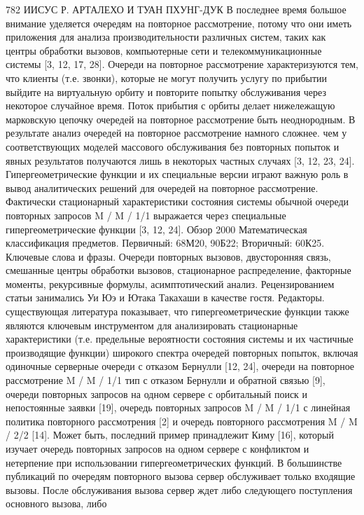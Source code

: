 782 ИИСУС Р. АРТАЛЕХО И ТУАН ПХУНГ-ДУК
В последнее время большое внимание уделяется очередям на повторное рассмотрение, потому что они
иметь приложения для анализа производительности различных систем, таких как центры обработки вызовов,
компьютерные сети и телекоммуникационные системы [3, 12, 17, 28]. Очереди на повторное рассмотрение
характеризуются тем, что клиенты (т.е. звонки), которые не могут получить услугу
по прибытии выйдите на виртуальную орбиту и повторите попытку обслуживания через некоторое случайное время.
Поток прибытия с орбиты делает нижележащую марковскую цепочку очередей на повторное рассмотрение
быть неоднородным. В результате анализ очередей на повторное рассмотрение намного сложнее.
чем у соответствующих моделей массового обслуживания без повторных попыток и явных результатов
получаются лишь в некоторых частных случаях [3, 12, 23, 24].
Гипергеометрические функции и их специальные версии играют важную роль в
вывод аналитических решений для очередей на повторное рассмотрение. Фактически стационарный
характеристики состояния системы обычной очереди повторных запросов M / M / 1/1
выражается через специальные гипергеометрические функции [3, 12, 24]. Обзор
2000 Математическая классификация предметов. Первичный: 68М20, 90Б22; Вторичный: 60К25.
Ключевые слова и фразы. Очереди повторных вызовов, двусторонняя связь, смешанные центры обработки вызовов, стационарное распределение, факторные моменты, рекурсивные формулы, асимптотический анализ.
Рецензированием статьи занимались Уи Юэ и Ютака Такахаши в качестве гостя.
Редакторы.
существующая литература показывает, что гипергеометрические функции также являются ключевым инструментом для
анализировать стационарные характеристики (т.е. предельные вероятности состояния системы
и их частичные производящие функции) широкого спектра очередей повторных попыток, включая
одиночные серверные очереди с отказом Бернулли [12, 24], очереди на повторное рассмотрение M / M / 1/1
тип с отказом Бернулли и обратной связью [9], очереди повторных запросов на одном сервере с
орбитальный поиск и непостоянные заявки [19], очередь повторных запросов M / M / 1/1 с
линейная политика повторного рассмотрения [2] и очередь повторного рассмотрения M / M / 2/2 [14]. Может быть, последний
пример принадлежит Киму [16], который изучает очередь повторных запросов на одном сервере с конфликтом
и нетерпение при использовании гипергеометрических функций.
В большинстве публикаций по очередям повторного вызова сервер обслуживает только входящие вызовы.
После обслуживания вызова сервер ждет либо следующего поступления основного вызова, либо

